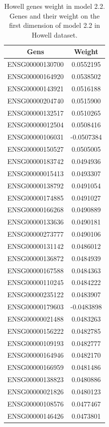 \documentclass[
  12pt,
  a4paper,
  twoside,
  openright]{book}
\begin{document}
\begin{longtable}[t]{cc}
\caption[Howell genes weight in model 2.2]{\label{tab:howell-genes-2-2}Howell genes weight in model 2.2. Genes and their weight on the first dimension of model 2.2 in Howell dataset.}\\
\toprule
Gens & Weight\\
\midrule
ENSG00000130700 & 0.0552195\\
ENSG00000164920 & 0.0538502\\
ENSG00000143921 & 0.0516188\\
ENSG00000204740 & 0.0515900\\
ENSG00000132517 & 0.0510265\\
\addlinespace
ENSG00000012504 & 0.0508416\\
ENSG00000106031 & -0.0507384\\
ENSG00000150527 & 0.0505005\\
ENSG00000183742 & 0.0494936\\
ENSG00000015413 & 0.0493307\\
\addlinespace
ENSG00000138792 & 0.0491054\\
ENSG00000174885 & 0.0491027\\
ENSG00000166268 & 0.0490889\\
ENSG00000133636 & 0.0490181\\
ENSG00000273777 & 0.0490106\\
\addlinespace
ENSG00000131142 & 0.0486012\\
ENSG00000136872 & 0.0484939\\
ENSG00000167588 & 0.0484363\\
ENSG00000110245 & 0.0484222\\
ENSG00000235122 & 0.0483907\\
\addlinespace
ENSG00000179603 & -0.0483898\\
ENSG00000021488 & 0.0483263\\
ENSG00000156222 & 0.0482785\\
ENSG00000109193 & 0.0482777\\
ENSG00000164946 & 0.0482170\\
\addlinespace
ENSG00000166959 & 0.0481486\\
ENSG00000138823 & 0.0480886\\
ENSG00000021826 & 0.0480123\\
ENSG00000108576 & 0.0477467\\
ENSG00000146426 & 0.0473801\\
\bottomrule
\end{longtable}
\end{document}
